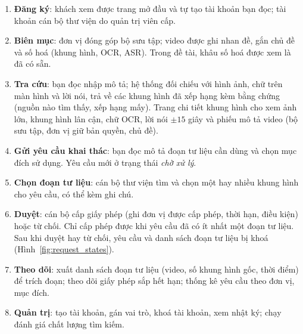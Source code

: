 \begin{enumerate}
    \item \textbf{Đăng ký}: khách xem được trang mở đầu và tự tạo tài khoản bạn đọc; tài
    khoản cán bộ thư viện do quản trị viên cấp.
    \item \textbf{Biên mục}: đơn vị đóng góp bộ sưu tập; video được ghi nhan đề, gắn chủ đề
    và số hoá (khung hình, OCR, ASR). Trong đề tài, khâu số hoá được xem là đã có sẵn.
    \item \textbf{Tra cứu}: bạn đọc nhập mô tả; hệ thống đối chiếu với hình ảnh, chữ trên màn
    hình và lời nói, trả về các khung hình đã xếp hạng kèm bằng chứng (nguồn nào tìm thấy, xếp
    hạng mấy). Trang chi tiết khung hình cho xem ảnh lớn, khung hình lân cận, chữ OCR, lời nói
    $\pm 15$ giây và phiếu mô tả video (bộ sưu tập, đơn vị giữ bản quyền, chủ đề).
    \item \textbf{Gửi yêu cầu khai thác}: bạn đọc mô tả đoạn tư liệu cần dùng và chọn mục đích
    sử dụng. Yêu cầu mới ở trạng thái \textit{chờ xử lý}.
    \item \textbf{Chọn đoạn tư liệu}: cán bộ thư viện tìm và chọn một hay nhiều khung hình cho
    yêu cầu, có thể kèm ghi chú.
    \item \textbf{Duyệt}: cán bộ cấp giấy phép (ghi đơn vị được cấp phép, thời hạn, điều kiện)
    hoặc từ chối. Chỉ cấp phép được khi yêu cầu đã có ít nhất một đoạn tư liệu. Sau khi duyệt
    hay từ chối, yêu cầu và danh sách đoạn tư liệu bị khoá (Hình~\ref{fig:request_states}).
    \item \textbf{Theo dõi}: xuất danh sách đoạn tư liệu (video, số khung hình gốc, thời điểm)
    để trích đoạn; theo dõi giấy phép sắp hết hạn; thống kê yêu cầu theo đơn vị, mục đích.
    \item \textbf{Quản trị}: tạo tài khoản, gán vai trò, khoá tài khoản, xem nhật ký; chạy
    đánh giá chất lượng tìm kiếm.
\end{enumerate}

